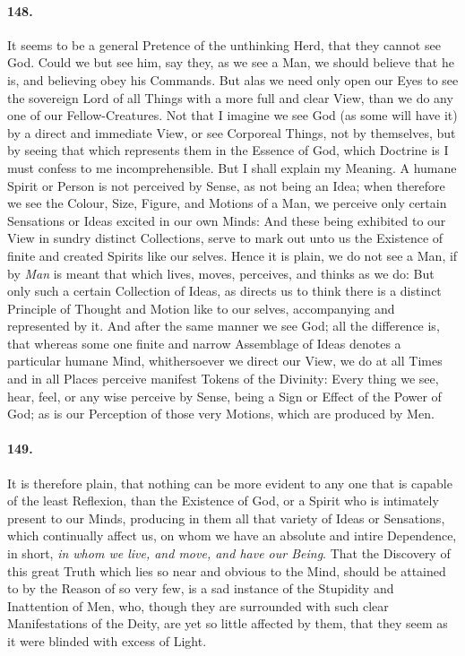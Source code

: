 \documentclass[]{article}
\newenvironment{sectionbody}{\begin{multicols}{2}}{\end{multicols}}
\begin{document}
\begin{sectionbody}
\paragraph{148.} It seems to be a general Pretence of the unthinking Herd, that
they cannot see {\sc God}.  Could we but see him, say they, as we
see a Man, we should believe that he is, and believing obey his
Commands.  But alas we need only open our Eyes to see the
sovereign Lord of all Things with a more full and clear View,
than we do any one of our Fellow-Creatures.  Not that I imagine
we see {\sc God} (as some will have it) by a direct and immediate
View, or see Corporeal Things, not by themselves, but by seeing
that which represents them in the Essence of {\sc God}, which
Doctrine is I must confess to me incomprehensible.  But I shall
explain my Meaning.  A humane Spirit or Person is not perceived
by Sense, as not being an Idea; when therefore we see the Colour,
Size, Figure, and Motions of a Man, we perceive only certain
Sensations or Ideas excited in our own Minds: And these being
exhibited to our View in sundry distinct Collections, serve to
mark out unto us the Existence of finite and created Spirits like
our selves.  Hence it is plain, we do not see a Man, if by {\it
Man} is meant that which lives, moves, perceives, and thinks as
we do: But only such a certain Collection of Ideas, as directs us
to think there is a distinct Principle of Thought and Motion like
to our selves, accompanying and represented by it.  And after the
same manner we see {\sc God}; all the difference is, that whereas
some one finite and narrow Assemblage of Ideas denotes a
particular humane Mind, whithersoever we direct our View, we do
at all Times and in all Places perceive manifest Tokens of the
Divinity: Every thing we see, hear, feel, or any wise perceive by
Sense, being a Sign or Effect of the Power of {\sc God}; as is
our Perception of those very Motions, which are produced by Men.



\paragraph{149.} It is therefore plain, that nothing can be more evident to any
one that is capable of the least Reflexion, than the Existence of
{\sc God}, or a Spirit who is intimately present to our Minds,
producing in them all that variety of Ideas or Sensations, which
continually affect us, on whom we have an absolute and intire
Dependence, in short, \emph{in whom we live, and move, and have
our Being}.  That the Discovery of this great Truth which lies so
near and obvious to the Mind, should be attained to by the Reason
of so very few, is a sad instance of the Stupidity and
Inattention of Men, who, though they are surrounded with such
clear Manifestations of the Deity, are yet so little affected by
them, that they seem as it were blinded with excess of Light.




\end{sectionbody}
\end{document}
